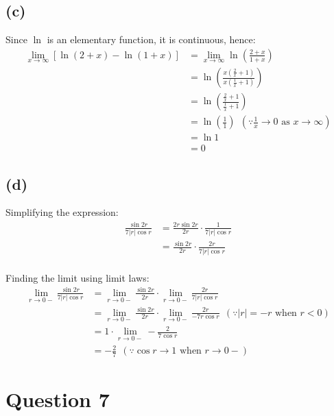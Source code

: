 \documentclass[11pt]{article}
\begin{document}
\subsection{(c)}
\label{sec:orgf573801}
Since \(\ln\) is an elementary function, it is continuous, hence:
\begin{align*}
\lim_{x \rightarrow \infty} [\ln (2 + x) - \ln(1 + x)] &= \lim_{x \rightarrow \infty} \ln \left( \frac{2 + x}{1 + x} \right) \\
&= \ln \left( \frac{x \left(\frac{2}{x} + 1 \right)}{x \left(\frac{1}{x} + 1 \right)} \right) \\
&= \ln \left( \frac{\frac{2}{x} + 1}{\frac{1}{x} + 1} \right) \\
&= \ln \left( \frac{1}{1} \right) \ \ \left(\because \frac{1}{x} \rightarrow 0 \text{ as } x \rightarrow \infty \right) \\
&= \ln 1 \\
&= 0
\end{align*}

\subsection{(d)}
\label{sec:orge205f6d}
Simplifying the expression:
\begin{align*}
\frac{\sin 2r}{7|r| \cos r} &= \frac{2r \sin 2r}{2r} \cdot \frac{1}{7|r| \cos r} \\
&= \frac{\sin 2r}{2r} \cdot \frac{2r}{7|r| \cos r} \\
\end{align*}

Finding the limit using limit laws:
\begin{align*}
\lim_{r \rightarrow 0-} \frac{\sin 2r}{7|r| \cos r} &= \lim_{r \rightarrow 0-} \frac{\sin 2r}{2r} \cdot \lim_{r \rightarrow 0-} \frac{2r}{7|r| \cos r} \\
&= \lim_{r \rightarrow 0-} \frac{\sin 2r}{2r} \cdot \lim_{r \rightarrow 0-} \frac{2r}{-7r \cos r} \ \ (\because |r| = -r \text{ when } r < 0) \\
&= 1 \cdot \lim_{r \rightarrow 0-} -\frac{2}{7 \cos r} \\
&= -\frac{2}{7} \ \ (\because \cos r \rightarrow 1 \text{ when } r \rightarrow 0-)
\end{align*}

\section{Question 7}
\label{sec:org018fc8d}
\end{document}
